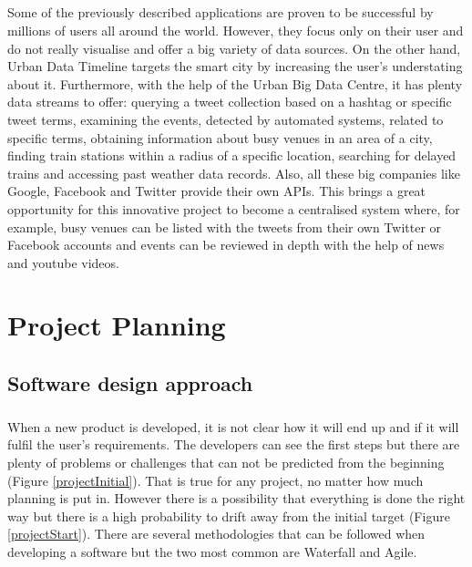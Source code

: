 \documentclass{l4proj}
\begin{document}
\paragraph{}
Some of the previously described applications are proven to be successful by millions of users all around the world. However, they focus only on their user and do not really visualise and offer a big variety of data sources. On the other hand, Urban Data Timeline targets the smart city by increasing the user's understating about it. Furthermore, with the help of the Urban Big Data Centre, it has plenty data streams to offer: querying a tweet collection based on a hashtag or specific tweet terms, examining the events, detected by automated systems, related to specific terms, obtaining information about busy venues in an area of a city, finding train stations within a radius of a specific location, searching for delayed trains and accessing past weather data records. Also, all these big companies like Google, Facebook and Twitter provide their own APIs. This brings a great opportunity for this innovative project to become a centralised system where, for example, busy venues can be listed with the tweets from their own Twitter or Facebook accounts and events can be reviewed in depth with the help of news and youtube videos.


\chapter{Project Planning}

\section{Software design approach}
\paragraph{}
When a new product is developed, it is not clear how it will end up and if it will fulfil the user's requirements. The developers can see the first steps but there are plenty of problems or challenges that can not be predicted from the beginning (Figure \ref{projectInitial}). That is true for any project, no matter how much planning is put in. However there is a possibility that everything is done the right way but there is a high probability to drift away from the initial target (Figure \ref{projectStart}). There are several methodologies that can be followed when developing a software but the two most common are Waterfall and Agile. 
\end{document}
